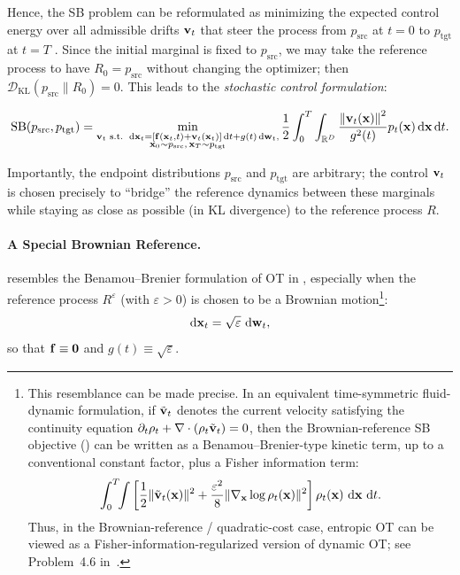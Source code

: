 Hence, the SB problem can be reformulated as minimizing the expected control
energy over all admissible drifts ${\mathbf{v}}_t$ that steer the process from
$p_{\mathrm{src}}$ at $t=0$ to $p_{\mathrm{tgt}}$ at $t=T$
\citep{dai1991stochastic,pra1990markov,pavon1991free,chen2016relation}.
Since the initial marginal is fixed to $p_{\mathrm{src}}$, we may take the
reference process to have $R_0=p_{\mathrm{src}}$ without changing the
optimizer; then
$\mathcal{D}_{\mathrm{KL}}(p_{\mathrm{src}}\|R_0)=0$.
This leads to the \emph{stochastic control formulation}:
\begin{mdframed}
\begin{align}\label{eq:sb-kinetic}
\begin{aligned}
\mathrm{SB}(p_{\mathrm{src}}, p_{\mathrm{tgt}})
=
\min_{\substack{
\mathbf{v}_t \text{ s.t. }
\mathop{}\!\mathrm{d} {\mathbf{x}}_t =
\left[{\mathbf{f}}({\mathbf{x}}_t,t)+\mathbf{v}_t({\mathbf{x}}_t)\right]\mathop{}\!\mathrm{d} t
+g(t)\mathop{}\!\mathrm{d}{\mathbf{w}}_t,\\
{\mathbf{x}}_0\sim p_{\mathrm{src}},\,
{\mathbf{x}}_T\sim p_{\mathrm{tgt}}
}}
\frac{1}{2}
\int_0^T\int_{\mathbb{R}^D}
\frac{\left\lVert{\mathbf{v}}_t({\mathbf{x}})\right\rVert^2}{g^2(t)}
p_t({\mathbf{x}})\mathop{}\!\mathrm{d}{\mathbf{x}}\mathop{}\!\mathrm{d} t .
\end{aligned}
\end{align}
\end{mdframed}
Importantly, the endpoint distributions $p_{\mathrm{src}}$ and $p_{\mathrm{tgt}}$ are arbitrary;
the control ${\mathbf{v}}_t$ is chosen precisely to ``bridge'' the reference dynamics between
these marginals while staying as close as possible (in KL divergence) to the reference
process $R$.

\paragraph{A Special Brownian Reference.}
 resembles the Benamou--Brenier formulation of OT
in , especially when the reference process
$R^\varepsilon$ (with $\varepsilon>0$) is chosen to be a Brownian
motion\footnote{This resemblance can be made precise. In an equivalent
time-symmetric fluid-dynamic formulation, if $\tilde{{\mathbf{v}}}_t$ denotes
the current velocity satisfying the continuity equation
$\partial_t \rho_t + \nabla \cdot (\rho_t \tilde{{\mathbf{v}}}_t)=0$, then the
Brownian-reference SB objective () can be
written as a Benamou--Brenier-type kinetic term, up to a conventional
constant factor, plus a Fisher information term:
\[
\int_0^T\!\!\int
\left[
\frac{1}{2}\|\tilde{{\mathbf{v}}}_t({\mathbf{x}})\|^2
+
\frac{\varepsilon^2}{8}\|\nabla_{{\mathbf{x}}}\log \rho_t({\mathbf{x}})\|^2
\right]\rho_t({\mathbf{x}})\,\mathop{}\!\mathrm{d}{\mathbf{x}}\,\mathop{}\!\mathrm{d} t.
\]
Thus, in the Brownian-reference / quadratic-cost case, entropic OT can
be viewed as a Fisher-information-regularized version of dynamic OT; see
Problem~4.6 in~\citet{chen2021stochastic}.}:
\[
\mathop{}\!\mathrm{d} {\mathbf{x}}_t = \sqrt{\varepsilon}\,\mathop{}\!\mathrm{d}{\mathbf{w}}_t,
\]
so that ${\mathbf{f}} \equiv \mathbf{0}$ and $g(t) \equiv \sqrt{\varepsilon}$.

